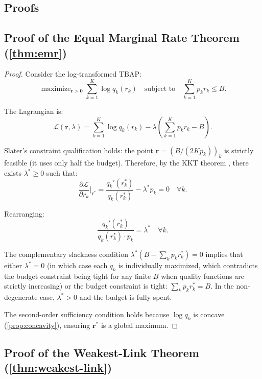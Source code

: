 \documentclass[11pt, a4paper, copyright]{googledeepmind}
\DeclareMathOperator*{\maximize}{maximize}
\begin{document}
\begin{appendices}

\section{Proofs}\label{app:proofs}

\subsection{Proof of the Equal Marginal Rate Theorem (\texorpdfstring{\cref{thm:emr}}{Theorem 3.3})}

\begin{proof}
Consider the log-transformed TBAP:
\[
    \maximize_{\mathbf{r} > \mathbf{0}} \sum_{k=1}^K \log q_k(r_k) \quad \text{subject to} \quad \sum_{k=1}^K p_k r_k \leq B.
\]

The Lagrangian is:
\[
    \mathcal{L}(\mathbf{r}, \lambda) = \sum_{k=1}^K \log q_k(r_k) - \lambda \left(\sum_{k=1}^K p_k r_k - B\right).
\]

Slater's constraint qualification holds: the point $\mathbf{r} = (B/(2Kp_k))_k$ is strictly feasible (it uses only half the budget). Therefore, by the KKT theorem \citep{boyd2004, bertsekas1999}, there exists $\lambda^* \geq 0$ such that:
\[
    \frac{\partial \mathcal{L}}{\partial r_k}\bigg|_{\mathbf{r}^*} = \frac{q_k'(r_k^*)}{q_k(r_k^*)} - \lambda^* p_k = 0 \quad \forall k.
\]

Rearranging:
\[
    \frac{q_k'(r_k^*)}{q_k(r_k^*) \cdot p_k} = \lambda^* \quad \forall k.
\]

The complementary slackness condition $\lambda^* (B - \sum_k p_k r_k^*) = 0$ implies that either $\lambda^* = 0$ (in which case each $q_k$ is individually maximized, which contradicts the budget constraint being tight for any finite $B$ when quality functions are strictly increasing) or the budget constraint is tight: $\sum_k p_k r_k^* = B$. In the non-degenerate case, $\lambda^* > 0$ and the budget is fully spent.

The second-order sufficiency condition holds because $\log q_k$ is concave (\cref{prop:concavity}), ensuring $\mathbf{r}^*$ is a global maximum.
\end{proof}

\subsection{Proof of the Weakest-Link Theorem (\texorpdfstring{\cref{thm:weakest-link}}{Theorem 3.5})}


\end{appendices}
\end{document}
